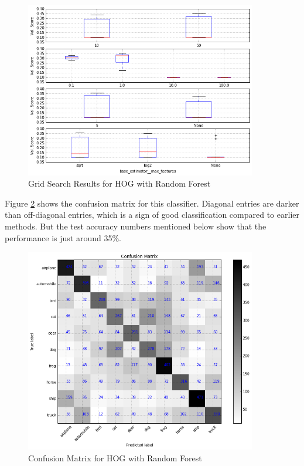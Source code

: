 \documentclass[12pt]{article}
\begin{document}
\begin{figure}[H]
\centering
\includegraphics[width=0.9\textwidth]{images/rf_cv_hog.png} 
\caption{Grid Search Results for HOG with Random Forest}
\label{img:rf_cv_hog}
\end{figure}
Figure \ref{img:rf_cm_hog} shows the confusion matrix for this classifier. Diagonal entries are darker than off-diagonal entries, which is a sign of good classification compared to earlier methods. But the test accuracy numbers mentioned below show that the performance is just around 35\%. 
\begin{figure}[H]
\centering
\includegraphics[width=0.9\textwidth]{images/rf_cm_hog.png} 
\caption{Confusion Matrix for HOG with Random Forest}
\label{img:rf_cm_hog}
\end{figure}
\end{document}
